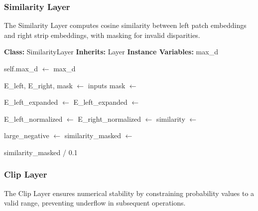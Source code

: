 \documentclass[12pt]{article}
\begin{document}
\subsubsection{Similarity Layer}
The Similarity Layer computes cosine similarity between left patch embeddings and right strip embeddings, with masking for invalid disparities.

\begin{algorithm}[H]
\caption{Similarity Layer Implementation}
\begin{algorithmic}[1]
\State \textbf{Class:} SimilarityLayer
\State \textbf{Inherits:} Layer
\State \textbf{Instance Variables:} max\_d 

    \State {}
    \State self.max\_d $\gets$ max\_d
\EndProcedure

    \State E\_left, E\_right, mask $\gets$ inputs 
    \State mask $\gets$  
    
    \State {}
    \State E\_left\_expanded $\gets$  
    \State E\_left\_expanded $\gets$ 
    
    \State {}
    \State E\_left\_normalized $\gets$ 
    \State E\_right\_normalized $\gets$ 
    \State similarity $\gets$ 
    
    \State {}
    \State large\_negative $\gets$ 
    \State similarity\_masked $\gets$ 
    
    \State {}
    \State \Return similarity\_masked / 0.1
\EndProcedure
\end{algorithmic}
\end{algorithm}

\subsubsection{Clip Layer}
The Clip Layer ensures numerical stability by constraining probability values to a valid range, preventing underflow in subsequent operations.
\end{document}
